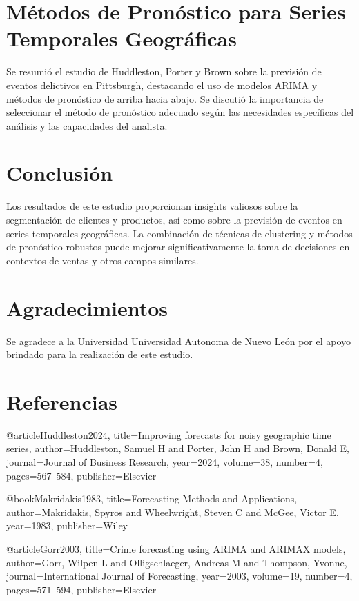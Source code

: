 \documentclass[preprint,12pt]{elsarticle}
\begin{document}
\section{Métodos de Pronóstico para Series Temporales Geográficas}
Se resumió el estudio de Huddleston, Porter y Brown sobre la previsión de eventos delictivos en Pittsburgh, destacando el uso de modelos ARIMA y métodos de pronóstico de arriba hacia abajo. Se discutió la importancia de seleccionar el método de pronóstico adecuado según las necesidades específicas del análisis y las capacidades del analista.

\section{Conclusión}
Los resultados de este estudio proporcionan insights valiosos sobre la segmentación de clientes y productos, así como sobre la previsión de eventos en series temporales geográficas. La combinación de técnicas de clustering y métodos de pronóstico robustos puede mejorar significativamente la toma de decisiones en contextos de ventas y otros campos similares.

\section*{Agradecimientos}
Se agradece a la Universidad Universidad Autonoma de Nuevo León por el apoyo brindado para la realización de este estudio.

\section*{Referencias}



@article{Huddleston2024,
  title={Improving forecasts for noisy geographic time series},
  author={Huddleston, Samuel H and Porter, John H and Brown, Donald E},
  journal={Journal of Business Research},
  year={2024},
  volume={38},
  number={4},
  pages={567--584},
  publisher={Elsevier}
}

@book{Makridakis1983,
  title={Forecasting Methods and Applications},
  author={Makridakis, Spyros and Wheelwright, Steven C and McGee, Victor E},
  year={1983},
  publisher={Wiley}
}

@article{Gorr2003,
  title={Crime forecasting using ARIMA and ARIMAX models},
  author={Gorr, Wilpen L and Olligschlaeger, Andreas M and Thompson, Yvonne},
  journal={International Journal of Forecasting},
  year={2003},
  volume={19},
  number={4},
  pages={571--594},
  publisher={Elsevier}
}
\end{document}
